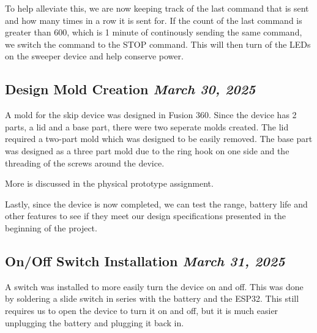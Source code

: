 \documentclass{article}
\newcommand{\logbookentry}[2]{
    \subsection*{#1 \hfill \textit{#2}} 
}
\begin{document}
To help alleviate this, we are now keeping track of the last command that is sent and how many times in a row it is sent for. If the count of the last command is greater than 600, which is 1 minute of continously sending the same command, we switch the command to the STOP command. This will then turn of the LEDs on the sweeper device and help conserve power.

\logbookentry{Design Mold Creation}{March 30, 2025}
A mold for the skip device was designed in Fusion 360. Since the device has 2 parts, a lid and a base part, there were two seperate molds created. The lid required a two-part mold which was designed to be easily removed. The base part was designed as a three part mold due to the ring hook on one side and the threading of the screws around the device. 

More is discussed in the physical prototype assignment.

Lastly, since the device is now completed, we can test the range, battery life and other features to see if they meet our design specifications presented in the beginning of the project.

\logbookentry{On/Off Switch Installation}{March 31, 2025}
A switch was installed to more easily turn the device on and off. This was done by soldering a slide switch in series with the battery and the ESP32. This still requires us to open the device to turn it on and off, but it is much easier unplugging the battery and plugging it back in.

\end{document}
